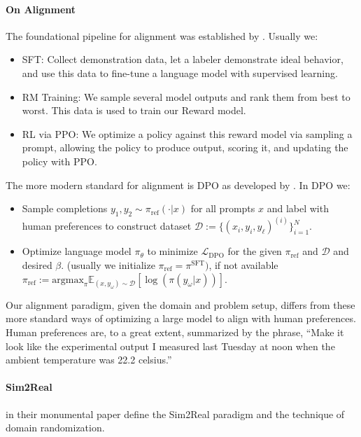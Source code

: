 \documentclass[10pt]{article}
\begin{document}
\paragraph{On Alignment} The foundational pipeline for alignment was established by \citet{ouyang2022training}. Usually we:
\begin{itemize}
    \item[(1)] SFT: Collect demonstration data, let a labeler demonstrate ideal behavior, and use this data to fine-tune a language model with supervised learning. 
    \item[(2)] RM Training: We sample several model outputs and rank them from best to worst. This data is used to train our Reward model.
    \item[(3)] RL via PPO: We optimize a policy against this reward model via sampling a prompt, allowing the policy to produce output, scoring it, and updating the policy with PPO.
\end{itemize}
The more modern standard for alignment is DPO as developed by \citet{rafailov2023direct}. In DPO we:
\begin{itemize}
    \item [(1)] Sample completions $y_1, y_2 \sim \pi_{\text{ref}}(\cdot|x)$ for all prompts $x$ and label with human preferences to construct dataset $\mathcal{D} := \{(x_i, y_i, y_{\ell})^{(i)}\}_{i=1}^{N}$. 
    \item [(2)] Optimize language model $\pi_{\theta}$ to minimize $\mathcal{L}_{\text{DPO}}$ for the given $\pi_{\text{ref}}$ and $\mathcal{D}$ and desired $\beta$. (usually we initialize $\pi_{\text{ref}} = \pi^{\text{SFT}})$, if not available $\pi_{\text{ref}} := \text{argmax}_{\pi} \mathbb{E}_{(x, y_\omega) \sim \mathcal{D}}[\log(\pi(y_{\omega}|x))]$.
\end{itemize}
Our alignment paradigm, given the domain and problem setup, differs from these more standard ways of optimizing a large model to align with human preferences. Human preferences are, to a great extent, summarized by the phrase, ``Make it look like the experimental output I measured last Tuesday at noon when the ambient temperature was 22.2 celsius.''

\paragraph{Sim2Real} \citet{Sim2Real} in their monumental paper define the Sim2Real paradigm and the technique of domain randomization. 
\end{document}
